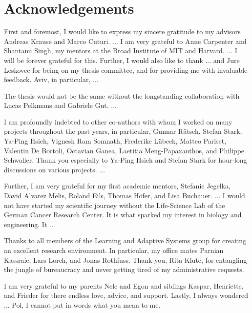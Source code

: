 
\bigskip

\begingroup
\let\clearpage\relax
\let\cleardoublepage\relax
\let\cleardoublepage\relax
\chapter*{Acknowledgements}

\def\thanks#1{%
\begingroup
\leftskip1em
\noindent #1
\par
\endgroup
}

First and foremost, I would like to express my sincere gratitude to my advisors Andreas Krause and Marco Cuturi.
...
I am very grateful to Anne Carpenter and Shantanu Singh, my mentors at the Broad Institute of MIT and Harvard. ... I will be forever grateful for this.
Further, I would also like to thank ... and Jure Leskovec for being on my thesis committee, and for providing me with invaluable feedback.
Aviv, in particular, ...

The thesis would not be the same without the longstanding collaboration with Lucas Pelkmans and Gabriele Gut. ...

I am profoundly indebted to other co-authors with whom I worked on many projects throughout the past years, in particular, Gunnar R\"atsch, Stefan Stark, Ya-Ping Hsieh, Vignesh Ram Somnath, Frederike L\"ubeck, Matteo Pariset, Valentin De Bortoli, Octavian Ganea, Laetitia Meng-Papaxanthos, and Philippe Schwaller. Thank you especially to Ya-Ping Hsieh and Stefan Stark for hour-long discussions on various projects. 
...

Further, I am very grateful for my first academic mentors, Stefanie Jegelka, David Alvarez Melis, Roland Eils, Thomas H\"ofer, and Lisa Buchauer. ...
I would not have started my scientific journey without the Life-Science Lab of the German Cancer Research Center. It is what sparked my interest in biology and engineering. It ...

Thanks to all members of the Learning and Adaptive Systems group for creating an excellent research environment. In particular, my office mates Parnian Kassraie, Lars Lorch, and Jonas Rothfuss. Thank you, Rita Klute, for entangling the jungle of bureaucracy and never getting tired of my administrative requests. 

I am very grateful to my parents Nele and Egon and siblings Kaspar, Henriette, and Frieder for there endless love, advice, and support.
Lastly, I always wondered ... Pol, I cannot put in words what you mean to me.


\endgroup
